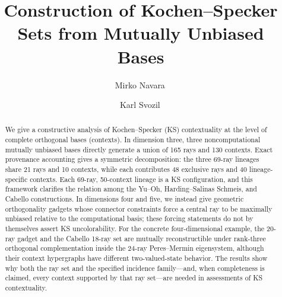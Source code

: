 \documentclass[%
  reprint,
  superscriptaddress,
  showpacs,
  showkeys,
  amsmath,amssymb,
  pra,
  longbibliography,
  floatfix,
  x11names
]{revtex4-2}
\newcommand{\rev}[1]{{\color{revisionblue}#1}}
\begin{document}
\title{Construction of Kochen--Specker Sets from Mutually Unbiased Bases}

\author{Mirko Navara\,}


\author{Karl Svozil\,}


\begin{abstract}
\rev{We give a constructive analysis of Kochen--Specker (KS) contextuality at the level of complete orthogonal bases (contexts). In dimension three, three noncomputational mutually unbiased bases directly generate a union of 165 rays and 130 contexts. Exact provenance accounting gives a symmetric decomposition: the three 69-ray lineages share 21 rays and 10 contexts, while each contributes 48 exclusive rays and 40 lineage-specific contexts. Each 69-ray, 50-context lineage is a KS configuration, and this framework clarifies the relation among the Yu--Oh, Harding--Salinas Schmeis, and Cabello constructions. In dimensions four and five, we instead give geometric orthogonality gadgets whose connector constraints force a central ray to be maximally unbiased relative to the computational basis; these forcing statements do not by themselves assert KS uncolorability. For the concrete four-dimensional example, the 20-ray gadget and the Cabello 18-ray set are mutually reconstructible under rank-three orthogonal complementation inside the 24-ray Peres--Mermin eigensystem, although their context hypergraphs have different two-valued-state behavior. The results show why both the ray set and the specified incidence family---and, when completeness is claimed, every context supported by that ray set---are needed in assessments of KS contextuality.}
\end{abstract}


\maketitle
\end{document}
